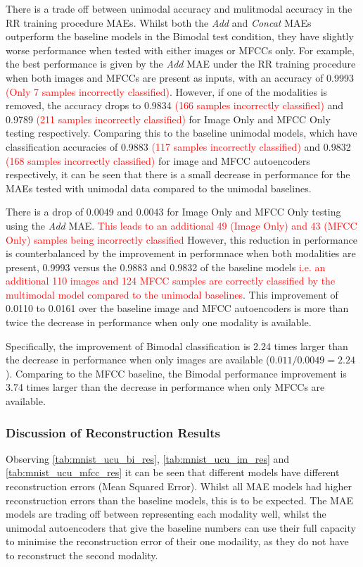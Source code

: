 There is a trade off between unimodal accuracy and mulitmodal accuracy in the RR training procedure \acp{MAE}. Whilst both the \textit{Add} and \textit{Concat} \acp{MAE} outperform the baseline models in the Bimodal test condition, they have slightly worse performance when tested with either images or \acp{MFCC} only. For example, the best performance is given by the \textit{Add} \ac{MAE} under the RR training procedure when both images and \acp{MFCC} are present as inputs, with an accuracy of 0.9993 \textcolor{red}{(Only 7 samples incorrectly classified)}. However, if one of the modalities is removed, the accuracy drops to 0.9834 \textcolor{red}{(166 samples incorrectly classified)} and 0.9789 \textcolor{red}{(211 samples incorrectly classified)} for Image Only and \ac{MFCC} Only testing respectively. Comparing this to the baseline unimodal models, which have classification accuracies of 0.9883 \textcolor{red}{(117 samples incorrectly classified)} and 0.9832 \textcolor{red}{(168 samples incorrectly classified)} for image and \ac{MFCC} autoencoders respectively, it can be seen that there is a small decrease in performance for the MAEs tested with unimodal data compared to the unimodal baselines. 

There is a drop of 0.0049 and 0.0043 for Image Only and \ac{MFCC} Only testing using the \textit{Add} \ac{MAE}. \textcolor{red}{This leads to an additional 49 (Image Only) and 43 (MFCC Only) samples being incorrectly classified} However, this reduction in performance is counterbalanced by the improvement in performnace when both modalities are present, 0.9993 versus the 0.9883 and 0.9832 of the baseline models \textcolor{red}{i.e. an additional 110 images and 124 MFCC samples are correctly classified by the multimodal model compared to the unimodal baselines}. This improvement of 0.0110 to 0.0161 over the baseline image and \ac{MFCC} autoencoders is more than twice the decrease in performance when only one modality is available. 

Specifically, the improvement of Bimodal classification is 2.24 times larger than the decrease in performance when only images are available ($0.011 / 0.0049 = 2.24$). Comparing to the \ac{MFCC} baseline, the Bimodal performance improvement is 3.74 times larger than the decrease in performance when only \acp{MFCC} are available.

\subsubsection{Discussion of Reconstruction Results}
Observing \autoref{tab:mnist_ucu_bi_res}, \autoref{tab:mnist_ucu_im_res} and \autoref{tab:mnist_ucu_mfcc_res} it can be seen that different models have different reconstruction errors (Mean Squared Error). Whilst all \ac{MAE} models had higher reconstruction errors than the baseline models, this is to be expected. The \ac{MAE} models are trading off between representing each modality well, whilst the unimodal autoencoders that give the baseline numbers can use their full capacity to minimise the reconstruction error of their one modaility, as they do not have to reconstruct the second modality. 

